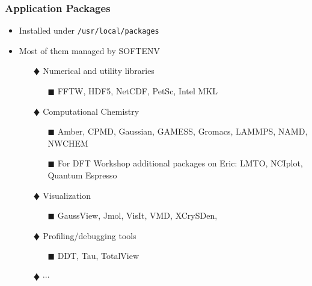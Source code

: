 \documentclass[slidestop,mathserif,compress,xcolor=svgnames,table]{beamer}
\begin{document}
\begin{frame}
\frametitle{\small Application Packages}
\begin{itemize}
\item Installed under \texttt{/usr/local/packages}
\item Most of them managed by SOFTENV
\begin{itemize}
\item[$\vardiamond$] Numerical and utility libraries
\begin{enumerate}
\item[$\blacksquare$] FFTW, HDF5, NetCDF, PetSc, Intel MKL
\end{enumerate}
\item[$\vardiamond$] Computational Chemistry
\begin{enumerate}
\item[$\blacksquare$] Amber, CPMD, Gaussian, GAMESS, Gromacs, LAMMPS, NAMD, NWCHEM
\item[$\blacksquare$] {\color{red}For DFT Workshop additional packages on Eric: LMTO, NCIplot, Quantum Espresso}
\end{enumerate}
\item[$\vardiamond$] Visualization
\begin{enumerate}
\item[$\blacksquare$] GaussView, {\color{red}Jmol}, VisIt, VMD, {\color{red}XCrySDen}, 
\end{enumerate}
\item[$\vardiamond$] Profiling/debugging tools
\begin{enumerate}
\item[$\blacksquare$] DDT, Tau, TotalView
\end{enumerate}
\item[$\vardiamond$] $\cdots$
\end{itemize}
\end{itemize}
\end{frame}
\end{document}
